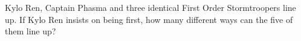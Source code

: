 Kylo Ren, Captain Phasma and three identical First Order Stormtroopers line up. If Kylo Ren insists on being first, how many different ways can the five of them line up?
